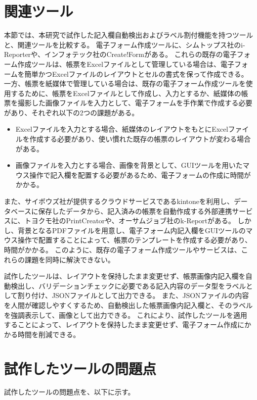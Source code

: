 \section{関連ツール}\label{sec:relation_tools}
本節では、本研究で試作した記入欄自動検出およびラベル割付機能を持つツールと、関連ツールを比較する。
電子フォーム作成ツールに、シムトップス社のi-Reporter\cite{i-Reporter}や、インフォテック社のCreate!Form\cite{Create!Form}がある。
これらの既存の電子フォーム作成ツールは、帳票をExcelファイルとして管理している場合は、電子フォームを簡単かつExcelファイルのレイアウトとセルの書式を保って作成できる。
一方、帳票を紙媒体で管理している場合は、既存の電子フォーム作成ツールを使用するために、帳票をExcelファイルとして作成し、入力とするか、紙媒体の帳票を撮影した画像ファイルを入力として、電子フォームを手作業で作成する必要があり、それぞれ以下の2つの課題がある。

\begin{itemize}
    \item Excelファイルを入力とする場合、紙媒体のレイアウトをもとにExcelファイルを作成する必要があり、使い慣れた既存の帳票のレイアウトが変わる場合がある。
    \item 画像ファイルを入力とする場合、画像を背景として、GUIツールを用いたマウス操作で記入欄を配置する必要があるため、電子フォームの作成に時間がかかる。
  \end{itemize}

また、サイボウズ社が提供するクラウドサービスであるkintone\cite{kintone}を利用し、データベースに保存したデータから、記入済みの帳票を自動作成する外部連携サービスに、トヨクモ社のPrintCreator\cite{PrintCreator}や、オーサムジョブ社のk-Report\cite{k-Report}がある。
しかし、背景となるPDFファイルを用意し、電子フォーム内記入欄をGUIツールのマウス操作で配置することによって、帳票のテンプレートを作成する必要があり、時間がかかる。
このように、既存の電子フォーム作成ツールやサービスは、これらの課題を同時に解決できない。

試作したツールは、レイアウトを保持したまま変更せず、帳票画像内記入欄を自動検出し、バリデーションチェックに必要である記入内容のデータ型をラベルとして割り付け、JSONファイルとして出力できる。
また、JSONファイルの内容を人間が確認しやすくするため、自動検出した帳票画像内記入欄と、そのラベルを強調表示して、画像として出力できる。
これにより、試作したツールを適用することによって、レイアウトを保持したまま変更せず、電子フォーム作成にかかる時間を削減できる。

\section{試作したツールの問題点}\label{sec:problems}
試作したツールの問題点を、以下に示す。

